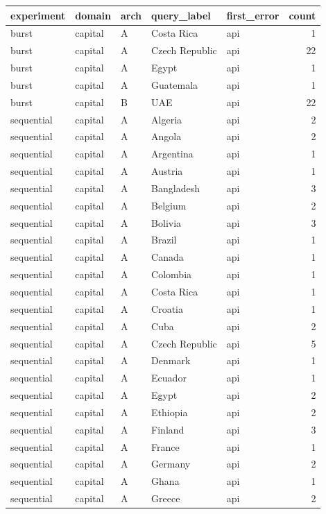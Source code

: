 \begin{tabular}{lllllr}
\toprule
experiment & domain & arch & query_label & first_error & count \\
\midrule
burst & capital & A & Costa Rica & api & 1 \\
burst & capital & A & Czech Republic & api & 22 \\
burst & capital & A & Egypt & api & 1 \\
burst & capital & A & Guatemala & api & 1 \\
burst & capital & B & UAE & api & 22 \\
sequential & capital & A & Algeria & api & 2 \\
sequential & capital & A & Angola & api & 2 \\
sequential & capital & A & Argentina & api & 1 \\
sequential & capital & A & Austria & api & 1 \\
sequential & capital & A & Bangladesh & api & 3 \\
sequential & capital & A & Belgium & api & 2 \\
sequential & capital & A & Bolivia & api & 3 \\
sequential & capital & A & Brazil & api & 1 \\
sequential & capital & A & Canada & api & 1 \\
sequential & capital & A & Colombia & api & 1 \\
sequential & capital & A & Costa Rica & api & 1 \\
sequential & capital & A & Croatia & api & 1 \\
sequential & capital & A & Cuba & api & 2 \\
sequential & capital & A & Czech Republic & api & 5 \\
sequential & capital & A & Denmark & api & 1 \\
sequential & capital & A & Ecuador & api & 1 \\
sequential & capital & A & Egypt & api & 2 \\
sequential & capital & A & Ethiopia & api & 2 \\
sequential & capital & A & Finland & api & 3 \\
sequential & capital & A & France & api & 1 \\
sequential & capital & A & Germany & api & 2 \\
sequential & capital & A & Ghana & api & 1 \\
sequential & capital & A & Greece & api & 2 \\

\end{tabular}
